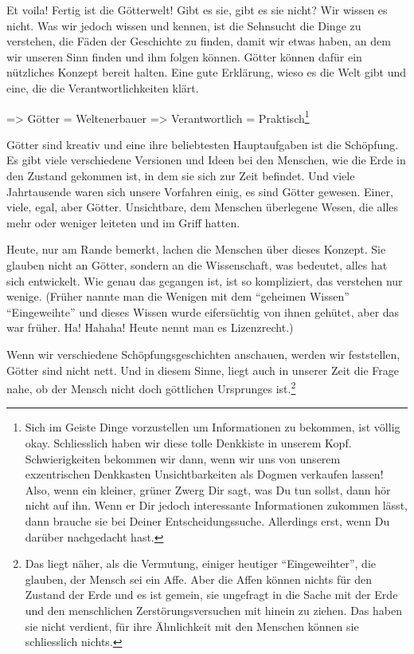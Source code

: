 \documentclass[11pt,titlepage,a5paper]{book}
\begin{document}
Et voila! Fertig ist die Götterwelt! Gibt es sie, gibt es sie nicht? Wir wissen es nicht. Was wir jedoch wissen und kennen, ist die Sehnsucht die Dinge zu verstehen, die Fäden der Geschichte zu finden, damit wir etwas haben, an dem wir unseren Sinn finden und ihm folgen können. Götter können dafür ein nützliches Konzept bereit halten. Eine gute Erklärung, wieso es die Welt gibt und eine, die die Verantwortlichkeiten klärt.

=> Götter = Weltenerbauer => Verantwortlich = Praktisch\footnote{Sich im Geiste Dinge vorzustellen um Informationen zu bekommen, ist völlig okay. Schliesslich haben wir diese tolle Denkkiste in unserem Kopf. Schwierigkeiten bekommen wir dann, wenn wir uns von unserem exzentrischen Denkkasten Unsichtbarkeiten als Dogmen verkaufen lassen! Also, wenn ein kleiner, grüner Zwerg Dir sagt, was Du tun sollst, dann hör nicht auf ihn. Wenn er Dir jedoch interessante Informationen zukommen lässt, dann brauche sie bei Deiner Entscheidungssuche. Allerdings erst, wenn Du darüber nachgedacht hast.}

Götter sind kreativ und eine ihre beliebtesten Hauptaufgaben ist die Schöpfung. Es gibt viele verschiedene Versionen und Ideen bei den Menschen, wie die Erde in den Zustand gekommen ist, in dem sie sich zur Zeit befindet. Und viele Jahrtausende waren sich unsere Vorfahren einig, es sind Götter gewesen. Einer, viele, egal, aber Götter. Unsichtbare, dem Menschen überlegene Wesen, die alles mehr oder weniger leiteten und im Griff hatten.

Heute, nur am Rande bemerkt, lachen die Menschen über dieses Konzept. Sie glauben nicht an Götter, sondern an die Wissenschaft, was bedeutet, alles hat sich entwickelt. Wie genau das gegangen ist, ist so kompliziert, das verstehen nur wenige. (Früher nannte man die Wenigen mit dem "`geheimen Wissen"' "`Eingeweihte"' und dieses Wissen wurde eifersüchtig von ihnen gehütet, aber das war früher. Ha! Hahaha! Heute nennt man es Lizenzrecht.) 

Wenn wir verschiedene Schöpfungsgeschichten anschauen, werden wir feststellen, Götter sind nicht nett. Und in diesem Sinne, liegt auch in unserer Zeit die Frage nahe, ob der Mensch nicht doch göttlichen Ursprunges ist.\footnote{Das liegt näher, als die Vermutung, einiger heutiger "`Eingeweihter"', die glauben, der Mensch sei ein Affe. Aber die Affen können nichts für den Zustand der Erde und es ist gemein, sie ungefragt in die Sache mit der Erde und den menschlichen Zerstörungsversuchen mit hinein zu ziehen. Das haben sie nicht verdient, für ihre Ähnlichkeit mit den Menschen können sie schliesslich nichts.}
\end{document}
